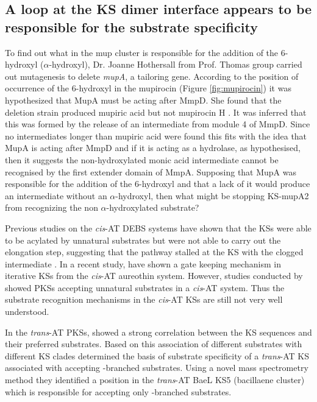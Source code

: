	\subsection{A loop at the KS dimer interface appears to be responsible for the substrate specificity}
	\label{sec:chap6Discussionksspecificity}
	To find out what in the mup cluster is responsible for the addition of the 6-hydroxyl ($ \alpha $-hydroxyl), Dr. Joanne Hothersall from Prof. Thomas group carried out mutagenesis to delete \textit{mupA}, a tailoring gene. According to the position of occurrence of the 6-hydroxyl in the mupirocin (Figure \ref{fig:mupirocin}) it was hypothesized that MupA must be acting after MmpD. She found that the deletion strain produced mupiric acid but not mupirocin H \parencite{Wu2008}. It was inferred that this was formed by the release of an intermediate from module 4 of MmpD. Since no intermediates longer than mupiric acid were found this fits with the idea that MupA is acting after MmpD and if it is acting as a hydrolase, as hypothesised, then it suggests the non-hydroxylated monic acid intermediate cannot be recognised by the first extender domain of MmpA. Supposing that MupA was responsible for the addition of the 6-hydroxyl and that a lack of it would produce an intermediate without an $ \alpha $-hydroxyl, then what might be stopping KS-mupA2 from recognizing the non $ \alpha $-hydroxylated substrate? 
	
	Previous studies on the \textit{cis}-AT DEBS systems have shown that the KSs were able to be acylated by	unnatural substrates but were not able to carry out the elongation step, suggesting that the pathway stalled at the KS with the clogged intermediate \parencite{Watanabe2003}. In a recent study, \textcite{Busch2013} have shown a gate keeping mechanism in iterative  KSs from the \textit{cis}-AT aureothin system. However, studies conducted by \textcite{Menzella2005} showed PKSs accepting unnatural substrates in a \textit{cis}-AT system. Thus the substrate recognition mechanisms in the \textit{cis}-AT KSs are still not very well understood. 
	
	In the \textit{trans}-AT PKSs, \textcite{Nguyen2008} showed a strong correlation between the KS sequences and their preferred substrates. Based on this association of different substrates with different KS clades \textcite{Jenner2013} determined the basis of substrate specificity of a \textit{trans}-AT KS associated with accepting \bet-branched substrates. Using a novel mass spectrometry method they identified a position in the \textit{trans}-AT BaeL KS5 (bacillaene cluster) which is responsible for accepting only \bet-branched substrates. 
	

